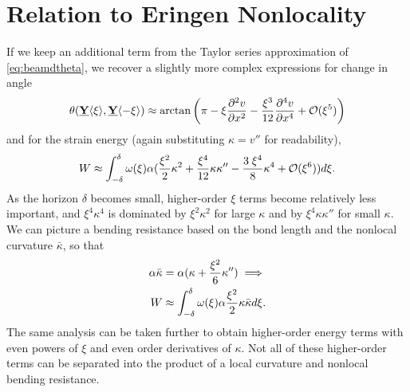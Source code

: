 \documentclass[5p,twocolumn]{elsarticle}
\newcommand\vstate[3]{%
	\mathbf{\underline{#1}}%
	\ifstrempty{#2}{}{[#2]}%
	\ifstrempty{#3}{}{\langle #3 \rangle}}
\begin{document}
\section{Relation to Eringen Nonlocality}
\label{sec:EringenCompare}
If we keep an additional term from the Taylor series approximation of \cref{eq:beamdtheta}, we recover a slightly more complex expressions for change in angle
%
\begin{equation}
\label{eq:beamdthetaHOT}
\theta(\vstate{Y}{}{\xi},\vstate{Y}{}{\mathbf{-\xi}}) \approx \arctan\left(\pi-\xi \frac{\partial^2 v}{\partial x^2} -\frac{\xi^3}{12} \frac{\partial^4 v}{\partial x^4}  +\mathcal{O}(\xi^5)\right)\notag
\end{equation}
%
and for the strain energy (again substituting \(\kappa = v''\) for readability),
%
%
%
\begin{equation}
W \approx \int_{-\delta}^\delta \omega(\xi)\alpha(\frac{\xi^2}{2}\kappa^2+\frac{\xi^4}{12}\kappa\kappa''-\frac{3\; \xi^4}{8}\kappa^4+\mathcal{O}(\xi^6)) d\xi.\notag
\end{equation}
%
As the horizon \(\delta\) becomes small, higher-order \(\xi\) terms become relatively less important, and \(\xi^4\kappa^4\) is dominated by \(\xi^2\kappa^2\) for large \(\kappa\) and by \(\xi^4\kappa\kappa''\) for small \(\kappa\).
We can picture a bending resistance based on the bond length and the nonlocal curvature  \(\bar{\kappa}\), so that 
%
\begin{align}
\label{eq:NLbending}
\alpha\bar{\kappa}&= \alpha(\kappa + \frac{\xi^2}{6}\kappa'') \implies  \\
W &\approx \int_{-\delta}^\delta \omega(\xi)\alpha \frac{\xi^2}{2}\kappa\bar{\kappa}d\xi.\notag
\end{align}
%  
The same analysis can be taken further to obtain higher-order energy terms with even powers of \(\xi\) and even order derivatives of \(\kappa\). 
Not all of these higher-order terms can be separated into the product of a local curvature and nonlocal bending resistance.
\end{document}
